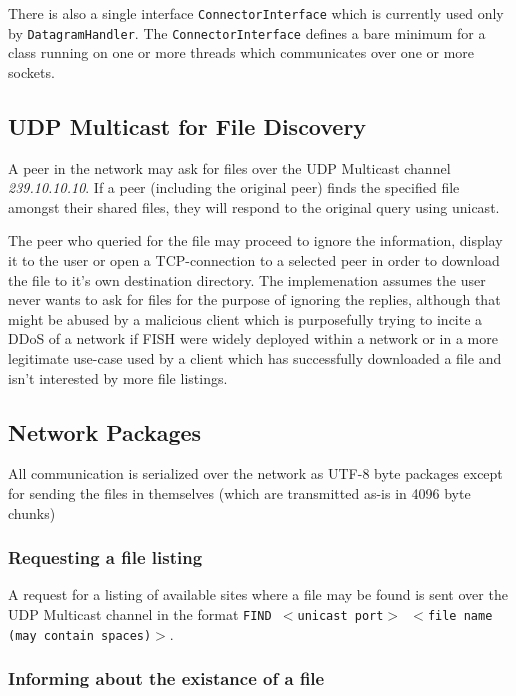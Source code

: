 \documentclass[11pt]{article}
\begin{document}
There is also a single interface \texttt{ConnectorInterface} which is currently
used only by \texttt{DatagramHandler}. The \texttt{ConnectorInterface} defines
a bare minimum for a class running on one or more threads which communicates
over one or more sockets.

\subsection{UDP Multicast for File Discovery}

A peer in the network may ask for files over the UDP Multicast channel
\textit{239.10.10.10}. If a peer (including the original peer) finds the
specified file amongst their shared files, they will respond to the original
query using unicast.

The peer who queried for the file may proceed to ignore the information,
display it to the user or open a TCP-connection to a selected peer in order
to download the file to it's own destination directory. The implemenation
assumes the user never wants to ask for files for the purpose of ignoring the
replies, although that might be abused by a malicious client which is
purposefully trying to incite a DDoS of a network if FISH were widely deployed
within a network or in a more legitimate use-case used by a client which has
successfully downloaded a file and isn't interested by more file listings.


\subsection{Network Packages}

All communication is serialized over the network as UTF-8 byte packages except
for sending the files in themselves (which are transmitted as-is in 4096 byte
chunks)

\subsubsection{Requesting a file listing}

A request for a listing of available sites where a file may be found is sent
over the UDP Multicast channel in the format
\texttt{FIND $<$unicast port$>$ $<$file name (may contain spaces)$>$}.

\subsubsection{Informing about the existance of a file}
\end{document}
